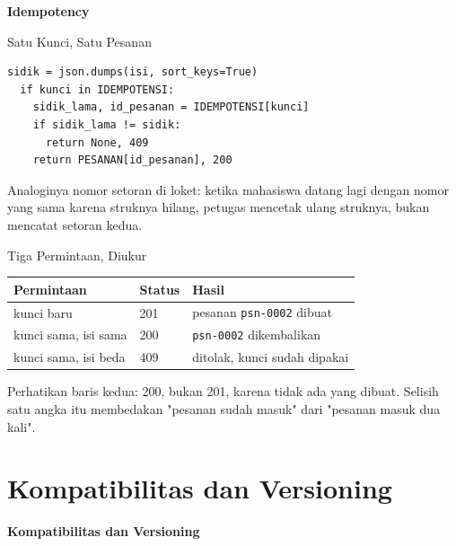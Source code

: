 \documentclass[aspectratio=169, table, 12pt]{beamer}
\begin{document}
\begin{frame}{\hfill}
  \centering
  \Huge{\textbf{Idempotency}}
\end{frame}

\begin{frame}[fragile]{{\Large Satu Kunci, Satu Pesanan}}
  \vspace{2pt}
\begin{lstlisting}[style=PythonStyle]
  sidik = json.dumps(isi, sort_keys=True)
  if kunci in IDEMPOTENSI:
    sidik_lama, id_pesanan = IDEMPOTENSI[kunci]
    if sidik_lama != sidik:
      return None, 409
    return PESANAN[id_pesanan], 200
\end{lstlisting}
  \vspace{2pt}
  {\small Analoginya nomor setoran di loket: ketika mahasiswa datang lagi
  dengan nomor yang sama karena struknya hilang, petugas mencetak ulang
  struknya, bukan mencatat setoran kedua.}
\end{frame}

\begin{frame}{{\Large Tiga Permintaan, Diukur}}
  \vspace{6pt}
  \centering
  {\footnotesize
  \begin{tabularx}{\textwidth}{Yll}
    \hline
    \textbf{Permintaan} & \textbf{Status} & \textbf{Hasil} \\
    \hline
    kunci baru & 201 & pesanan \texttt{psn-0002} dibuat \\
    \hline
    kunci sama, isi sama & 200 & \texttt{psn-0002} dikembalikan \\
    \hline
    kunci sama, isi beda & 409 & ditolak, kunci sudah dipakai \\
    \hline
  \end{tabularx}}

  \vspace{6pt}
  {\small Perhatikan baris kedua: 200, bukan 201, karena tidak ada yang
  dibuat. Selisih satu angka itu membedakan "pesanan sudah masuk" dari
  "pesanan masuk dua kali".}
\end{frame}

\section{Kompatibilitas dan Versioning}

\begin{frame}{\hfill}
  \centering
  \Huge{\textbf{Kompatibilitas dan Versioning}}
\end{frame}
\end{document}
